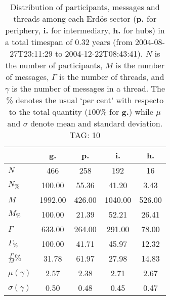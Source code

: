 \begin{table}[h!]
\begin{center}
\begin{tabular}{| l || c | c | c | c |}\hline
 & {\bf g.} & {\bf p.} & {\bf i.} & {\bf h.} \\\hline\hline
$N$ & 466  & 258  & 192  & 16 \\
$N_{\%}$ & 100.00  & 55.36  & 41.20  & 3.43 \\\hline
$M$ & 1992.00  & 426.00  & 1040.00  & 526.00 \\
$M_{\%}$ & 100.00  & 21.39  & 52.21  & 26.41 \\\hline
$\Gamma$ & 633.00  & 264.00  & 291.00  & 78.00 \\
$\Gamma_{\%}$ & 100.00  & 41.71  & 45.97  & 12.32 \\\hline
$\frac{\Gamma}{M}\%$ & 31.78  & 61.97  & 27.98  & 14.83 \\
$\mu(\gamma)$ & 2.57  & 2.38  & 2.71  & 2.67 \\
$\sigma(\gamma)$ & 0.50  & 0.48  & 0.45  & 0.47 \\\hline
\end{tabular}
\caption{Distribution of participants, messages and threads among each Erd\"os sector ({\bf p.} for periphery, {\bf i.} for intermediary, 
    {\bf h.} for hubs) in a total timespan of 0.32 years (from 2004-08-27T23:11:29 to 2004-12-22T08:43:41). $N$ is the number of participants, $M$ is the number of messages, $\Gamma$ is the number of threads, and $\gamma$ is the number of messages in a thread.
    The \% denotes the usual `per cent' with respecto to the total quantity ($100\%$ for {\bf g.})
    while $\mu$ and $\sigma$ denote mean and standard deviation. TAG: 10}
\end{center}
\end{table}